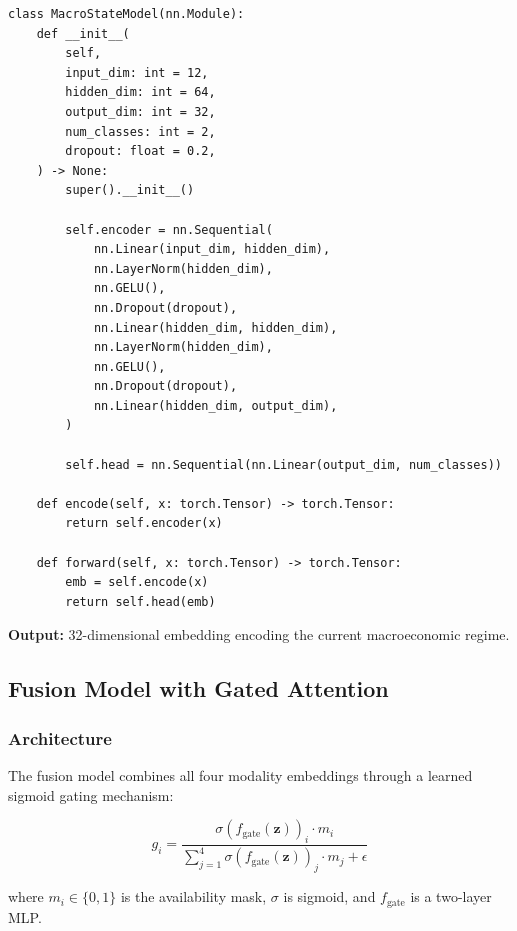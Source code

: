 \documentclass[12pt,a4paper]{article}
\begin{document}
\begin{lstlisting}[caption={Macro feature encoder (src/models/macro\_model.py)}]
class MacroStateModel(nn.Module):
    def __init__(
        self,
        input_dim: int = 12,
        hidden_dim: int = 64,
        output_dim: int = 32,
        num_classes: int = 2,
        dropout: float = 0.2,
    ) -> None:
        super().__init__()

        self.encoder = nn.Sequential(
            nn.Linear(input_dim, hidden_dim),
            nn.LayerNorm(hidden_dim),
            nn.GELU(),
            nn.Dropout(dropout),
            nn.Linear(hidden_dim, hidden_dim),
            nn.LayerNorm(hidden_dim),
            nn.GELU(),
            nn.Dropout(dropout),
            nn.Linear(hidden_dim, output_dim),
        )

        self.head = nn.Sequential(nn.Linear(output_dim, num_classes))

    def encode(self, x: torch.Tensor) -> torch.Tensor:
        return self.encoder(x)

    def forward(self, x: torch.Tensor) -> torch.Tensor:
        emb = self.encode(x)
        return self.head(emb)
\end{lstlisting}

\textbf{Output:} 32-dimensional embedding encoding the current macroeconomic regime.

\subsection{Fusion Model with Gated Attention}

\subsubsection{Architecture}

The fusion model combines all four modality embeddings through a learned sigmoid gating mechanism:

\begin{equation}
    g_i = \frac{\sigma(f_{\text{gate}}(\mathbf{z}))_i \cdot m_i}{\sum_{j=1}^{4} \sigma(f_{\text{gate}}(\mathbf{z}))_j \cdot m_j + \epsilon}
\end{equation}

where $m_i \in \{0,1\}$ is the availability mask, $\sigma$ is sigmoid, and $f_{\text{gate}}$ is a two-layer MLP.
\end{document}
